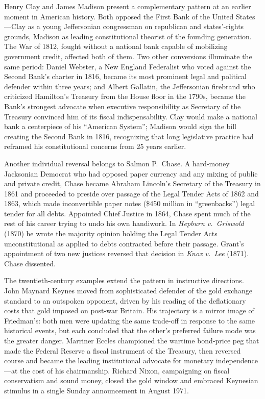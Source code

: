 \documentclass[12pt]{article}
\begin{document}
Henry Clay and James Madison present a complementary pattern at an
earlier moment in American history.  Both opposed the First Bank of the
United States---Clay as a young Jeffersonian congressman on republican
and states'-rights grounds, Madison as leading constitutional
theorist of the founding generation.  The War of 1812, fought without a national bank capable of mobilizing
government credit, affected both of them.  Two other  conversions
illuminate the same period: Daniel Webster, a New England Federalist who
voted against the Second Bank's charter in 1816, became its most
prominent legal and political defender within three years; and Albert
Gallatin, the Jeffersonian firebrand who criticized Hamilton's Treasury
from the House floor in the 1790s, became the Bank's strongest advocate
when executive responsibility as Secretary of the Treasury convinced him of  its
fiscal indispensability.  Clay would make a national bank
a centerpiece of his ``American System''; Madison would sign the bill
creating the Second Bank in 1816, recognizing 
that long legislative practice had reframed his constitutional
concerns from 25 years earlier.

Another  individual reversal belongs to Salmon P.\ Chase.  A
hard-money Jacksonian Democrat who had 
opposed  paper currency and any  mixing of public and private
credit, Chase became Abraham Lincoln's Secretary of the Treasury in 1861
and proceeded to preside over passage of the Legal Tender Acts of 1862 and
1863, which made inconvertible paper notes (\$450 million in
``greenbacks'') legal tender for all debts.  Appointed Chief Justice
in 1864, Chase spent much of the rest of his career trying to undo his own
handiwork.  In \textit{Hepburn v.\ Griswold} (1870) he wrote the
majority opinion holding the Legal Tender Acts unconstitutional as
applied to debts contracted before their passage.  Grant's appointment  of
two new justices reversed that decision in \textit{Knox v.\ Lee} (1871).
Chase dissented.

The twentieth-century examples extend the pattern in instructive
directions.  John Maynard Keynes moved from sophisticated defender of
the gold exchange standard to an outspoken opponent, driven by
his reading of the deflationary costs that gold imposed on post-war
Britain.  His trajectory is a mirror image of Friedman's: both men
were updating the same trade-off in response to the same historical
events, but each concluded that the other's preferred failure mode was
the greater danger.  Marriner Eccles championed the wartime bond-price
peg that made the Federal Reserve a fiscal instrument of the Treasury,
then reversed course and became the leading institutional advocate for
monetary independence---at the cost of his chairmanship.  Richard
Nixon, campaigning on fiscal conservatism and sound money, closed the
gold window and embraced Keynesian stimulus in a single Sunday
announcement in August 1971.
\end{document}
